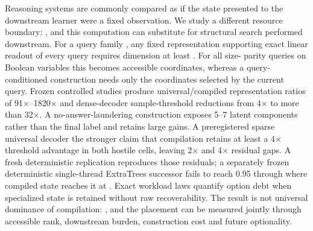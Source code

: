 \markdownRendererDocumentBegin
Reasoning systems are commonly compared as if the state presented to the downstream learner were a fixed observation. We study a different resource boundary: , and this computation can substitute for structural search performed downstream. For a query family , any fixed representation supporting exact linear readout of every query requires dimension at least . For all size- parity queries on  Boolean variables this becomes  accessible coordinates, whereas a query-conditioned construction needs only the coordinates selected by the current query. Frozen controlled studies produce universal/compiled representation ratios of 91×–1820× and dense-decoder sample-threshold reductions from 4× to more than 32×. A no-answer-laundering construction exposes 5–7 latent components rather than the final label and retains large gains. A preregistered sparse universal decoder  the stronger claim that compilation retains at least a 4× threshold advantage in both hostile cells, leaving 2× and 4× residual gaps. A fresh deterministic replication reproduces those residuals; a separately frozen deterministic single-thread ExtraTrees successor fails to reach 0.95 through  where compiled state reaches it at . Exact workload laws quantify option debt when specialized state is retained without raw recoverability. The result is not universal dominance of compilation: , and the placement can be measured jointly through accessible rank, downstream burden, construction cost and future optionality.\markdownRendererDocumentEnd